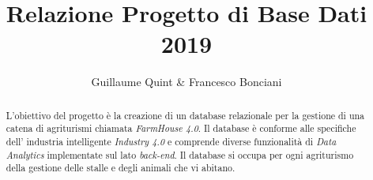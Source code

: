 \documentclass[12pt,a4paper]{article}
\author{Guillaume Quint \& Francesco Bonciani}
\title{Relazione Progetto di Base Dati 2019}
\begin{document}
\maketitle
\thispagestyle{empty}
\clearpage
{}
\renewcommand{\abstractname}{Visione d'insieme}


\begin{abstract}
L'obiettivo del progetto è la creazione di un database relazionale per la gestione di una catena di agriturismi chiamata \textit{FarmHouse 4.0}. 
Il database è conforme alle specifiche dell' industria intelligente \textit{Industry 4.0} e comprende diverse funzionalità di \textit{Data Analytics} implementate sul lato \textit{back-end}. 
Il database si occupa per ogni agriturismo della gestione delle stalle e degli animali che vi abitano.


\end{abstract}
\end{document}
